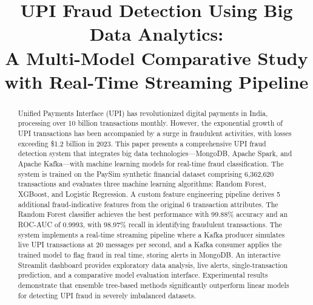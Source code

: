 \documentclass[conference]{IEEEtran}
\begin{document}
\title{UPI Fraud Detection Using Big Data Analytics:\\A Multi-Model Comparative Study with Real-Time Streaming Pipeline}

\author{
\and
{}
}

\maketitle

\begin{abstract}
Unified Payments Interface (UPI) has revolutionized digital payments in India, processing over 10 billion transactions monthly. However, the exponential growth of UPI transactions has been accompanied by a surge in fraudulent activities, with losses exceeding \$1.2 billion in 2023. This paper presents a comprehensive UPI fraud detection system that integrates big data technologies---MongoDB, Apache Spark, and Apache Kafka---with machine learning models for real-time fraud classification. The system is trained on the PaySim synthetic financial dataset comprising 6,362,620 transactions and evaluates three machine learning algorithms: Random Forest, XGBoost, and Logistic Regression. A custom feature engineering pipeline derives 5 additional fraud-indicative features from the original 6 transaction attributes. The Random Forest classifier achieves the best performance with 99.88\% accuracy and an ROC-AUC of 0.9993, with 98.97\% recall in identifying fraudulent transactions. The system implements a real-time streaming pipeline where a Kafka producer simulates live UPI transactions at 20 messages per second, and a Kafka consumer applies the trained model to flag fraud in real time, storing alerts in MongoDB. An interactive Streamlit dashboard provides exploratory data analysis, live alerts, single-transaction prediction, and a comparative model evaluation interface. Experimental results demonstrate that ensemble tree-based methods significantly outperform linear models for detecting UPI fraud in severely imbalanced datasets.
\end{abstract}
\end{document}
